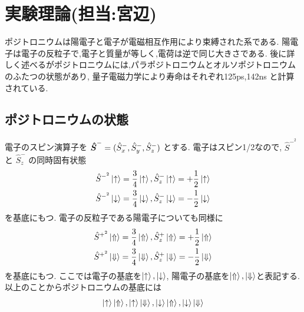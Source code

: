 \chapter{実験理論(担当:宮辺)}\label{theory}



ポジトロニウムは陽電子と電子が電磁相互作用により束縛された系である.
陽電子は電子の反粒子で,電子と質量が等しく,電荷は逆で同じ大きさである.
後に詳しく述べるがポジトロニウムには,パラポジトロニウムとオルソポジトロニウムのふたつの状態があり,
量子電磁力学により寿命はそれぞれ125ps,142ns と計算されている.


\section{ポジトロニウムの状態}

電子のスピン演算子を
$\mbox{\boldmath $\hat{S}$}^{-} = (\hat{S}^{-}_{x},\hat{S}^{-}_{y},\hat{S}^{-}_{z})$
とする.
電子はスピン1/2なので,
$\hat{S}^{-^{2}}$
と
$\hat{S}^{-}_{z}$
の同時固有状態
\begin{equation}
\begin{split}
\hat{S}^{-^{2}} \ket{ \uparrow } = \frac{3}{4} \ket{ \uparrow },
\hat{S}^{-}_{z} \ket{ \uparrow } = + \frac{1}{2} \ket{ \uparrow } \\
\hat{S}^{-^{2}} \ket{ \downarrow } = \frac{3}{4} \ket{ \downarrow },
\hat{S}^{-}_{z} \ket{ \downarrow } = - \frac{1}{2} \ket{ \downarrow }
\end{split}
\label{eq:groundele}
\end{equation}
を基底にもつ.
電子の反粒子である陽電子についても同様に
\begin{equation}
\begin{split}
\hat{S}^{+^{2}} \ket{ \Uparrow } = \frac{3}{4} \ket{ \Uparrow },
\hat{S}^{+}_{z} \ket{ \Uparrow } = + \frac{1}{2} \ket{ \Uparrow } \\
\hat{S}^{+^{2}} \ket{ \Downarrow } = \frac{3}{4} \ket{ \Downarrow },
\hat{S}^{+}_{z} \ket{ \Downarrow } = - \frac{1}{2} \ket{ \Downarrow }
\end{split}
\label{eq:groundeposi}
\end{equation}
を基底にもつ.
ここでは電子の基底を$\ket{ \uparrow },\ket{ \downarrow }$,
陽電子の基底を$\ket{ \Uparrow },\ket{ \Downarrow }$と表記する.
以上のことからポジトロニウムの基底には
\begin{equation}
	\nonumber
\ket{ \uparrow } \ket{ \Uparrow },\ket{ \uparrow } \ket{ \Downarrow },
\ket{ \downarrow } \ket{ \Uparrow },\ket{ \downarrow } \ket{ \Downarrow }
\end{equation}
